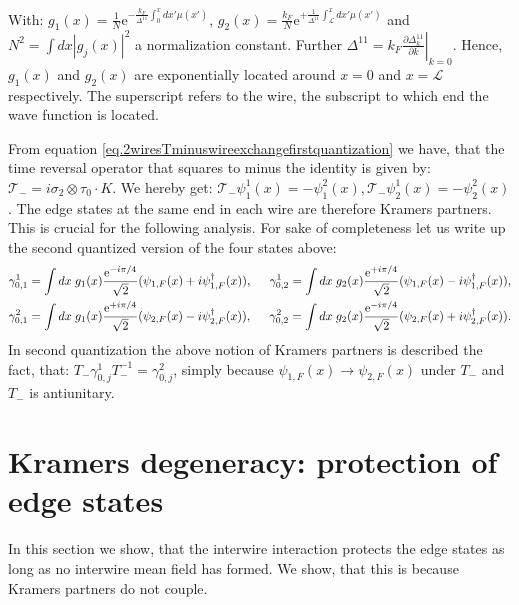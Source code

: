 With: $g_1(x) = \frac{1}{N}\text{e}^{-\frac{k_F}{\Delta^{11}}\int_{0}^{x} dx' \mu(x')}$, $g_2(x) = \frac{k_F}{N}\text{e}^{+\frac{1}{\Delta^{11}}\int_{\mathcal{L}}^{x} dx' \mu(x')}$ and $N^2 = \int dx |g_j(x)|^2$ a normalization constant. Further $\Delta^{11} = k_F\left.\frac{\partial \Delta^{11}_k}{\partial k}\right|_{k = 0}$. Hence, $g_1(x)$ and $g_2(x)$ are exponentially located around $x = 0$ and $x = \mathcal{L}$ respectively. The superscript refers to the wire, the subscript to which end the wave function is located. 

From equation \eqref{eq.2wiresTminuswireexchangefirstquantization} we have, that the time reversal operator that squares to minus the identity is given by: $\mathcal{T}_- = i\sigma_2\otimes\tau_0 \cdot K$. We hereby get: $\mathcal{T}_-\psi^1_1(x) = -\psi^2_1(x), \mathcal{T}_-\psi^1_2(x) = -\psi^2_2(x)$. The edge states at the same end in each wire are therefore Kramers partners. This is crucial for the following analysis. For sake of completeness let us write up the second quantized version of the four states above: 
\begin{align}
\gamma^1_{0,1} &= \int dx \; g_1(x)\frac{\text{e}^{-i\pi/4}}{\sqrt{2}}(\psi_{1,F}(x) + i\psi^\dagger_{1,F}(x)), \hspace{0.5cm} \gamma^1_{0,2} = \int dx \; g_2(x)\frac{\text{e}^{+i\pi/4}}{\sqrt{2}}(\psi_{1,F}(x) - i\psi^\dagger_{1,F}(x)), \nonumber \\
\gamma^2_{0,1} &= \int dx \; g_1(x)\frac{\text{e}^{+i\pi/4}}{\sqrt{2}}(\psi_{2,F}(x) - i\psi^\dagger_{2,F}(x)), \hspace{0.5cm} \gamma^2_{0,2} = \int dx \; g_2(x)\frac{\text{e}^{-i\pi/4}}{\sqrt{2}}(\psi_{2,F}(x) + i \psi^\dagger_{2,F}(x)). \nonumber 
\end{align}
In second quantization the above notion of Kramers partners is described the fact, that: $T_-\gamma^1_{0,j}T_-^{-1} = \gamma^2_{0,j}$, simply because $\psi_{1,F}(x) \to \psi_{2,F}(x)$ under $T_-$ and $T_-$ is antiunitary. 

\section{Kramers degeneracy: protection of edge states}
\label{sec.2wireskramersdegeneracy}
In this section we show, that the interwire interaction protects the edge states as long as no interwire mean field has formed. We show, that this is because Kramers partners do not couple.

